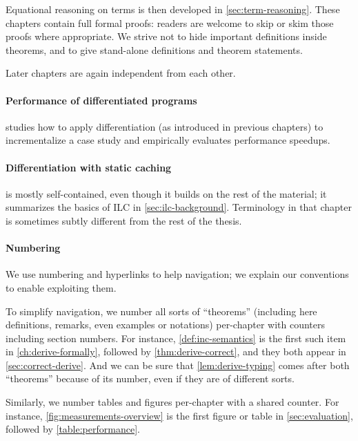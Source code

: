 Equational reasoning on terms is then developed
in \cref{sec:term-reasoning}. These chapters contain full formal proofs: readers
are welcome to skip or skim those proofs where appropriate. We strive not to
hide important definitions inside theorems, and to give stand-alone definitions
and theorem statements.

Later chapters are again independent from each other.

\paragraph{Performance of differentiated programs}
 studies how to apply differentiation (as introduced in
previous chapters) to incrementalize a case study and empirically evaluates
performance speedups.

\paragraph{Differentiation with static caching}
 is mostly self-contained, even though it builds on the rest of the
material; it summarizes the basics of ILC in \cref{sec:ilc-background}.
Terminology in that chapter is sometimes subtly different from the rest of the thesis.



\paragraph{Numbering}
We use numbering and hyperlinks to help navigation; we explain our conventions
to enable exploiting them.

To simplify navigation, we number all sorts of ``theorems'' (including here
definitions, remarks, even examples or notations)
per-chapter with counters including section numbers. For
instance, \cref{def:inc-semantics} is the first such item in
\cref{ch:derive-formally}, followed by \cref{thm:derive-correct}, and they both
appear in \cref{sec:correct-derive}. And we can be sure that \cref{lem:derive-typing}
comes after both ``theorems'' because of its number, even if they are of different sorts.

Similarly, we number tables and figures per-chapter with a shared counter. For instance,
\cref{fig:measurements-overview} is the first figure or table in \cref{sec:evaluation},
followed by \cref{table:performance}.


